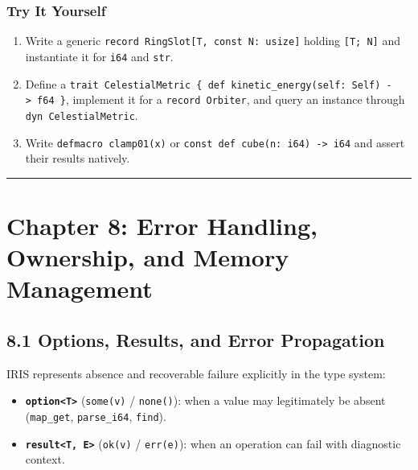 \documentclass[
  english,
  oneside]{book}
\newcounter{none} %
\providecommand{\tightlist}{%
  \setlength{\itemsep}{0pt}\setlength{\parskip}{0pt}}
\begin{document}
\subsection{Try It Yourself}\label{try-it-yourself-6}

\begin{enumerate}
\def\labelenumi{\arabic{enumi}.}
\tightlist
\item
  Write a generic \texttt{record\ RingSlot{[}T,\ const\ N:\ usize{]}}
  holding \texttt{{[}T;\ N{]}} and instantiate it for \texttt{i64} and
  \texttt{str}.
\item
  Define a
  \texttt{trait\ CelestialMetric\ \{\ def\ kinetic\_energy(self:\ Self)\ -\textgreater{}\ f64\ \}},
  implement it for a \texttt{record\ Orbiter}, and query an instance
  through \texttt{dyn\ CelestialMetric}.
\item
  Write \texttt{defmacro\ clamp01(x)} or
  \texttt{const\ def\ cube(n:\ i64)\ -\textgreater{}\ i64} and assert
  their results natively.
\end{enumerate}

\begin{center}\rule{0.5\linewidth}{0.5pt}\end{center}

\chapter{Chapter 8: Error Handling, Ownership, and Memory
Management}\label{chapter-8-error-handling-ownership-and-memory-management}

\section{8.1 Options, Results, and Error
Propagation}\label{options-results-and-error-propagation}

IRIS represents absence and recoverable failure explicitly in the type
system:

\begin{itemize}
\tightlist
\item
  \textbf{\texttt{option\textless{}T\textgreater{}}} (\texttt{some(v)} /
  \texttt{none()}): when a value may legitimately be absent
  (\texttt{map\_get}, \texttt{parse\_i64}, \texttt{find}).
\item
  \textbf{\texttt{result\textless{}T,\ E\textgreater{}}} (\texttt{ok(v)}
  / \texttt{err(e)}): when an operation can fail with diagnostic
  context.
\end{itemize}
\end{document}
